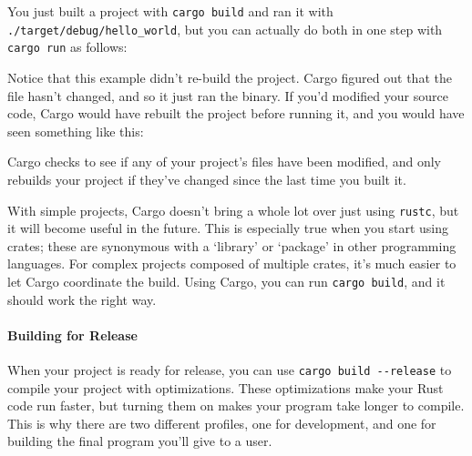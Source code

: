 \documentclass[a4paper,]{book}
\newenvironment{Shaded}{\begin{snugshade}}{\end{snugshade}}
\newcommand{\KeywordTok}[1]{\textcolor[rgb]{0.13,0.29,0.53}{\textbf{{#1}}}}
\newcommand{\NormalTok}[1]{{#1}}
\let\oldparagraph\paragraph
\renewcommand{\paragraph}[1]{\oldparagraph{#1}\mbox{}}
\begin{document}
You just built a project with \texttt{cargo\ build} and ran it with
\texttt{./target/debug/hello\_world}, but you can actually do both in
one step with \texttt{cargo\ run} as follows:

\begin{Shaded}
\end{Shaded}

Notice that this example didn't re-build the project. Cargo figured out
that the file hasn't changed, and so it just ran the binary. If you'd
modified your source code, Cargo would have rebuilt the project before
running it, and you would have seen something like this:

\begin{Shaded}
\end{Shaded}

Cargo checks to see if any of your project's files have been modified,
and only rebuilds your project if they've changed since the last time
you built it.

With simple projects, Cargo doesn't bring a whole lot over just using
\texttt{rustc}, but it will become useful in the future. This is
especially true when you start using crates; these are synonymous with a
`library' or `package' in other programming languages. For complex
projects composed of multiple crates, it's much easier to let Cargo
coordinate the build. Using Cargo, you can run \texttt{cargo\ build},
and it should work the right way.

\paragraph{Building for Release}\label{building-for-release}

When your project is ready for release, you can use
\texttt{cargo\ build\ -\/-release} to compile your project with
optimizations. These optimizations make your Rust code run faster, but
turning them on makes your program take longer to compile. This is why
there are two different profiles, one for development, and one for
building the final program you'll give to a user.
\end{document}
